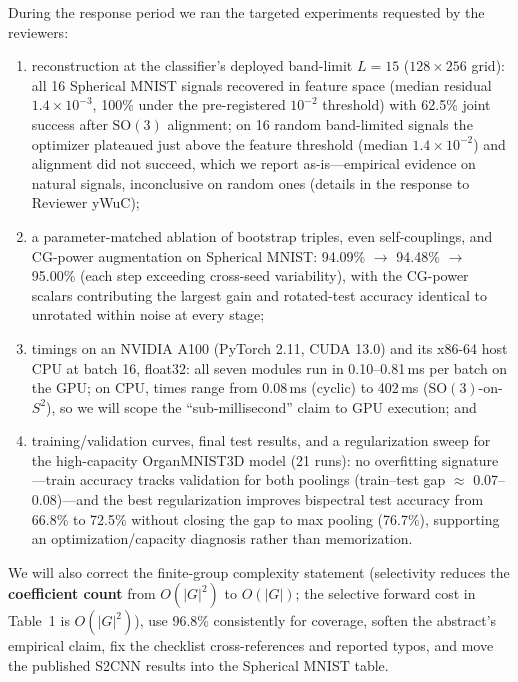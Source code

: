 \documentclass[10pt]{article}
\begin{document}
During the response period we ran the targeted experiments requested by the
reviewers:

\begin{enumerate}
\item reconstruction at the classifier's deployed band-limit $L=15$
  ($128\times256$ grid): all 16 Spherical MNIST signals recovered in feature
  space (median residual $1.4\times10^{-3}$, 100\% under the pre-registered
  $10^{-2}$ threshold) with 62.5\% joint success after $\mathrm{SO}(3)$
  alignment; on 16 random band-limited signals the optimizer plateaued just
  above the feature threshold (median $1.4\times10^{-2}$) and alignment did
  not succeed, which we report as-is---empirical evidence on natural signals,
  inconclusive on random ones (details in the response to Reviewer yWuC);
\item a parameter-matched ablation of bootstrap triples, even self-couplings,
  and CG-power augmentation on Spherical MNIST: 94.09\% $\to$ 94.48\% $\to$
  95.00\% (each step exceeding cross-seed variability), with the CG-power
  scalars contributing the largest gain and rotated-test accuracy identical to
  unrotated within noise at every stage;
\item timings on an NVIDIA A100 (PyTorch 2.11, CUDA 13.0) and its x86-64 host
  CPU at batch 16, float32: all seven modules run in 0.10--0.81\,ms per batch
  on the GPU; on CPU, times range from 0.08\,ms (cyclic) to 402\,ms
  ($\mathrm{SO}(3)$-on-$S^2$), so we will scope the ``sub-millisecond'' claim
  to GPU execution; and
\item training/validation curves, final test results, and a regularization
  sweep for the high-capacity OrganMNIST3D model (21 runs): no overfitting
  signature---train accuracy tracks validation for both poolings (train--test
  gap $\approx$ 0.07--0.08)---and the best regularization improves bispectral
  test accuracy from 66.8\% to 72.5\% without closing the gap to max pooling
  (76.7\%), supporting an optimization/capacity diagnosis rather than
  memorization.
\end{enumerate}

We will also correct the finite-group complexity statement (selectivity
reduces the \textbf{coefficient count} from $O(|G|^2)$ to $O(|G|)$; the
selective forward cost in Table~1 is $O(|G|^2)$), use 96.8\% consistently for
coverage, soften the abstract's empirical claim, fix the checklist
cross-references and reported typos, and move the published S2CNN results into
the Spherical MNIST table.
\end{document}
